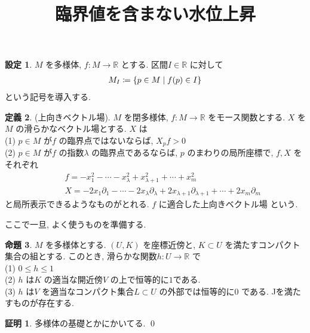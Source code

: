 \documentclass[10pt, fleqn, label-section=none]{bxjsarticle}
\title{臨界値を含まない水位上昇}
\date{}
\author{}
\theoremstyle{definition}
\newtheorem{dfn}{定義}[section]
\newtheorem{prop}[dfn]{命題}
\newtheorem{setting}[dfn]{設定}
\newtheorem*{pf*}{証明}
\newcommand{\cbra}[1]{\mleft\{#1\mright\}}
\renewcommand{\;}{\, ; \,}
\begin{document}
\maketitle

\section{}


\begin{setting} $M$ を多様体, $f: M \rightarrow \mathbb R$ とする. 区間$ I \in \mathbb R$ に対して
\begin{align*}  M_{I}  \coloneqq  \cbra{p \in M \mid f(p) \in  I}   \end{align*}
という記号を導入する. 
\end{setting}



\begin{dfn}(上向きベクトル場). $M$ を閉多様体, $f: M \rightarrow \mathbb R$ をモース関数とする. $X$ を$M$ の滑らかなベクトル場とする. $X$ は \\
(1) $p \in M$ が$f$ の臨界点ではないならば, $X_p f > 0$ \\
(2) $p \in M $ が$f$ の指数$\lambda$ の臨界点であるならば, $p$ のまわりの局所座標で, $f, X$ をそれぞれ \\  
\begin{align*} &\quad f = -x_1 ^2 - \cdots - x^2_{\lambda} + x^2_{\lambda + 1} + \cdots + x^2_m \\
&\quad X =  - 2x_1 \partial_1 - \cdots - 2 x_{\lambda } \partial_\lambda + 2 x_{\lambda + 1} \partial_{\lambda + 1} + \cdots + 2x_m \partial_m \end{align*}
と局所表示できるようなものがとれる. 
$f$ に適合した上向きベクトル場 という. 
\end{dfn}


ここで一旦, よく使うものを準備する.

\begin{prop}$M$ を多様体とする. $(U, K)$ を座標近傍と, $K \subset U$ を満たすコンパクト集合の組とする. このとき, 滑らかな関数$h : U \rightarrow \mathbb R$ で\\
(1) $0 \leq h \leq 1$ \\
(2) $h$ は$K$ の適当な開近傍$V$ の上で恒等的に$1$である. \\
(3) $h$ は$V$ を適当なコンパクト集合$L \subset U$ の外部では恒等的に$0$ である. ^^
を満たすものが存在する. 

\end{prop}
\begin{pf*}
多様体の基礎とかにかいてる.
\qed
\end{pf*}
\end{document}
